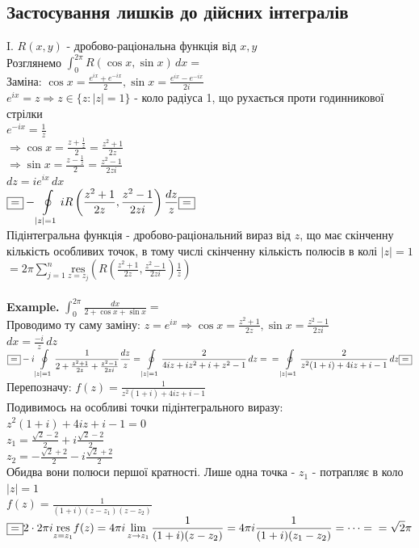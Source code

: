 \documentclass[a4paper, 10pt]{article}
\def\residue#1#2{\underset{z = {#1}}{\textrm{res}} {#2}}
\def\hugespace{\vspace{5mm} \\}
\theoremstyle{theoremdd}
\theoremstyle{theoremdd}
\theoremstyle{theoremdd}
\theoremstyle{theoremdd}
\theoremstyle{theoremdd}
\theoremstyle{theoremdd}
\theoremstyle{theoremdd}
\theoremstyle{theoremdd}
\begin{document}
\subsection{Застосування лишків до дійсних інтегралів}
I. $R(x,y)$ - дробово-раціональна функція від $x,y$\\
Розглянемо $\displaystyle \int_{0}^{2\pi} R(\cos x, \sin x) \,dx \boxed{=}$\\
Заміна: $\displaystyle \cos x = \frac{e^{ix}+e^{-ix}}{2}, \sin x = \frac{e^{ix}-e^{-ix}}{2i}$\\
$\displaystyle e^{ix} = z \Rightarrow z \in \{z: |z| = 1\}$ - коло радіуса 1, що рухається проти годинникової стрілки\\
$\displaystyle e^{-ix} = \frac{1}{z}$\\
$\Rightarrow \displaystyle \cos x = \frac{z+\frac{1}{z}}{2} = \frac{z^2+1}{2z}$\\
$\Rightarrow \displaystyle \sin x = \frac{z-\frac{1}{z}}{2} = \frac{z^2-1}{2zi}$\\
$dz = i e^{ix}\,dx$\\
$\displaystyle \boxed{=} -\oint\displaylimits_{|z|=1} iR\left(\frac{z^2+1}{2z}, \frac{z^2-1}{2zi}\right) \frac{dz}{z} \boxed{=}$\\
Підінтегральна функція - дробово-раціональний вираз від $z$, що має скінченну кількість особливих точок, в тому числі скінченну кількість полюсів в колі $|z|=1$\\
$\displaystyle \boxed{=} 2 \pi \sum_{j=1}^n \residue{z_j}{\left(R\left(\frac{z^2+1}{2z}, \frac{z^2-1}{2zi}\right) \frac{1}{z}\right)}$\\
\hugespace
\textbf{Example.} $\displaystyle \int_{0}^{2\pi} \frac{dx}{2 + \cos x + \sin x} \boxed{=}$\\
Проводимо ту саму заміну:  $\displaystyle z = e^{ix} \Rightarrow \cos x = \frac{z^2+1}{2z}, \sin x = \frac{z^2-1}{2zi}$\\
$\displaystyle dx = \frac{-i}{z} \,dz$\\
$\displaystyle \boxed{=} -i\oint\displaylimits_{|z|=1} \frac{1}{2+ \frac{z^2+1}{2z} + \frac{z^2-1}{2zi}} \frac{dz}{z} = \oint\displaylimits_{|z|=1} \frac{2}{4iz + iz^2 + i + z^2 - 1} \,dz = \\ = \oint\displaylimits_{|z|=1} \frac{2}{z^2(1+i) + 4iz + i-1} \,dz \boxed{=}$\\
Перепозначу: $\displaystyle f(z) = \frac{1}{z^2(1+i)+4iz+i-1}$\\
Подивимось на особливі точки підінтегрального виразу:\\
$z^2(1+i)+4iz+i-1=0$\\
$z_1 = \displaystyle \frac{\sqrt{2}-2}{2} + i \frac{\sqrt{2}-2}{2}$\\
$z_2 = \displaystyle -\frac{\sqrt{2}+2}{2} - i \frac{\sqrt{2}+2}{2}$\\
Обидва вони полюси першої кратності. Лише одна точка - $z_1$ - потрапляє в коло $|z| =1$\\
$\displaystyle f(z) = \frac{1}{(1+i)(z-z_1)(z-z_2)}$\\
$\displaystyle \boxed{=} 2 \cdot 2\pi i \residue{z_1}{f(z)} = 4 \pi i \lim_{z \to z_1} \frac{1}{(1+i)(z-z_2)} = 4 \pi i \frac{1}{(1+i)(z_1 - z_2)} = \dots = \\ = \sqrt{2} \pi$
\hugespace
\end{document}
